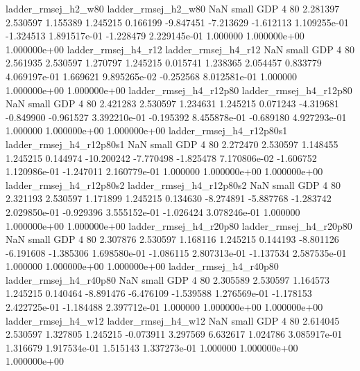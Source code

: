      ladder_rmsej_h2_w80      ladder_rmsej_h2_w80                   NaN      small      GDP                 4 80 2.281397       2.530597 1.155389       1.245215    0.166199     -9.847451     -7.213629    -1.612113   1.109255e-01 -1.324513 1.891517e-01    -1.228479   2.229145e-01            1.000000    1.000000e+00        1.000000e+00
     ladder_rmsej_h4_r12      ladder_rmsej_h4_r12                   NaN      small      GDP                 4 80 2.561935       2.530597 1.270797       1.245215    0.015741      1.238365      2.054457     0.833779   4.069197e-01  1.669621 9.895265e-02    -0.252568   8.012581e-01            1.000000    1.000000e+00        1.000000e+00
  ladder_rmsej_h4_r12p80   ladder_rmsej_h4_r12p80                   NaN      small      GDP                 4 80 2.421283       2.530597 1.234631       1.245215    0.071243     -4.319681     -0.849900    -0.961527   3.392210e-01 -0.195392 8.455878e-01    -0.689180   4.927293e-01            1.000000    1.000000e+00        1.000000e+00
ladder_rmsej_h4_r12p80s1 ladder_rmsej_h4_r12p80s1                   NaN      small      GDP                 4 80 2.272470       2.530597 1.148455       1.245215    0.144974    -10.200242     -7.770498    -1.825478   7.170806e-02 -1.606752 1.120986e-01    -1.247011   2.160779e-01            1.000000    1.000000e+00        1.000000e+00
ladder_rmsej_h4_r12p80s2 ladder_rmsej_h4_r12p80s2                   NaN      small      GDP                 4 80 2.321193       2.530597 1.171899       1.245215    0.134630     -8.274891     -5.887768    -1.283742   2.029850e-01 -0.929396 3.555152e-01    -1.026424   3.078246e-01            1.000000    1.000000e+00        1.000000e+00
  ladder_rmsej_h4_r20p80   ladder_rmsej_h4_r20p80                   NaN      small      GDP                 4 80 2.307876       2.530597 1.168116       1.245215    0.144193     -8.801126     -6.191608    -1.385306   1.698580e-01 -1.086115 2.807313e-01    -1.137534   2.587535e-01            1.000000    1.000000e+00        1.000000e+00
  ladder_rmsej_h4_r40p80   ladder_rmsej_h4_r40p80                   NaN      small      GDP                 4 80 2.305589       2.530597 1.164573       1.245215    0.140464     -8.891476     -6.476109    -1.539588   1.276569e-01 -1.178153 2.422725e-01    -1.184488   2.397712e-01            1.000000    1.000000e+00        1.000000e+00
     ladder_rmsej_h4_w12      ladder_rmsej_h4_w12                   NaN      small      GDP                 4 80 2.614045       2.530597 1.327805       1.245215   -0.073911      3.297569      6.632617     1.024786   3.085917e-01  1.316679 1.917534e-01     1.515143   1.337273e-01            1.000000    1.000000e+00        1.000000e+00
